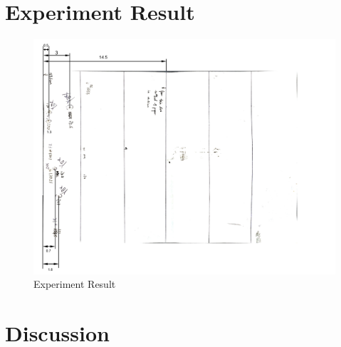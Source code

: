 \documentclass[conference]{IEEEtran}
\begin{document}
\section{Experiment Result}
    \begin{figure}[H]
        \centering
        \includegraphics[width=1\linewidth]{experiment result.png}
        \caption{Experiment Result}
        \label{simplevr}
    \end{figure}
\section{Discussion}
\end{document}
